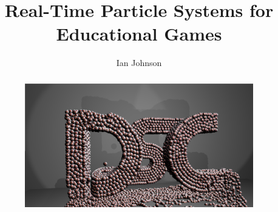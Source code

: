 \documentclass[11pt]{fsuthesis}
\title{Real-Time Particle Systems for Educational Games}
\author{Ian Johnson}
\begin{document}
\frontmatter
\maketitle
\makesignaturepage



\tableofcontents
\listoffigures



\begin{abstract}
\begin{figure}[!htc]
 		\centering
		\includegraphics[scale=0.25]{figures/dsc_fsuseal.png}
		\label{fig:dsc_fsuseal}
\end{figure}

\end{abstract}

\mainmatter










\pagebreak

\appendix



\end{document}
